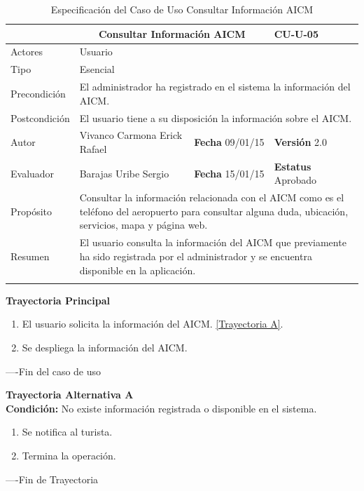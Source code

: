 \begin{longtable}{|p{2.5cm}|p{6.4cm}|p{2cm}|p{2cm}|}
	\hline
		\rowcolor[RGB]{51,153,255}{Caso de Uso}&\multicolumn{2}{c}{Consultar Información AICM}&{\textbf{CU-U-05}}\\
	\hline
		{Actores}&\multicolumn{3}{p{11.2cm}|}{Usuario}\\
	\hline
		{Tipo}&\multicolumn{3}{p{11.2cm}|}{Esencial}\\
	\hline
		{Precondición}&\multicolumn{3}{p{11.2cm}|}{El administrador ha registrado en el sistema la información del AICM.}\\
	\hline
		{Postcondición}&\multicolumn{3}{p{11.2cm}|}{El usuario tiene a su disposición la información sobre el AICM.}\\
	\hline
		{Autor}&{Vivanco Carmona Erick Rafael}&{\textbf{Fecha} 09/01/15}&{\textbf{Versión} 2.0}\\
			\hline
		{Evaluador}&{Barajas Uribe Sergio}&{\textbf{Fecha} 15/01/15}&{\textbf{Estatus} Aprobado}\\
	\hline
		{Propósito}&\multicolumn{3}{p{11.2cm}|}{Consultar la información relacionada con el AICM como es el teléfono del aeropuerto para consultar alguna duda, ubicación, servicios, mapa y página web.}\\
	\hline
		{Resumen}&\multicolumn{3}{p{11.2cm}|}{El usuario consulta la información del AICM que previamente ha sido registrada por el administrador y se encuentra disponible en la aplicación.}\\	
	\hline
	\caption[Especificación del Caso de Uso Consultar Información AICM]{Especificación del Caso de Uso Consultar Información AICM}
    	\label{tab:cuConsultarInformacionAICM}
\end{longtable}

\begin{flushleft}
	\textbf{Trayectoria Principal}\\
	\begin{enumerate}
		\item El usuario solicita la información del AICM. \hyperlink{TrayectoriaA_CU-U-05}{[Trayectoria A]}.
		\item Se despliega la información del AICM.
	\end{enumerate}
\end{flushleft}
----Fin del caso de uso

\begin{flushleft}
	\hypertarget{TrayectoriaA_CU-U-05}{}
	\textbf{Trayectoria Alternativa A}\\
	\textbf{Condición:} No existe información registrada o disponible en el sistema. \\
	\begin{enumerate}
		\item  Se notifica al turista. 
		\item Termina la operación.
	\end{enumerate}
\end{flushleft}
----Fin de Trayectoria
\clearpage

